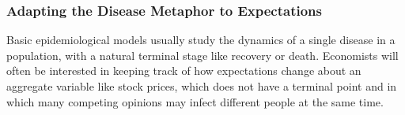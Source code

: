 





\subsubsection{Adapting the Disease Metaphor to Expectations}\label{subsubsec:AdaptingTheModel}
\hypertarget{AdaptingTheModel}{}

Basic epidemiological models usually study the dynamics of a single disease in a population, with a natural terminal stage like recovery or death.  Economists will often be interested in keeping track of how expectations change about an aggregate variable like stock prices, which does not have a terminal point and in which many competing opinions may infect different people at the same time.

